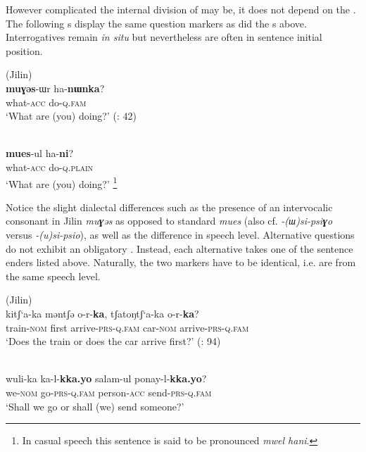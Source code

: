 However complicated the internal division of  may be, it does not depend on the . The following s display the same question markers as did the s above. Interrogatives remain \textit{in situ} \citep[265]{Sohn1999} but nevertheless are often in sentence initial position.

\ea%
    \label{ex:kore:4}
     (Jilin)\\
    \gll \textbf{{muɣəs}}-ɯr  ha-\textbf{{nɯnka}}?\\
    what-\textsc{acc}  do-\textsc{q.fam}\\
    \glt ‘What are (you) doing?’ (\citealt{XuanDewu1985}: 42)
    \z

\ea%
    \label{ex:kore:5}
    \\
    \gll \textbf{{mues}}-ul  ha-\textbf{{ni}}?\\
    what-\textsc{acc}  do-\textsc{q.plain}\\
    \glt ‘What are (you) doing?’ \citep[146]{Song2005}\footnote{In casual speech this sentence is said to be pronounced \textit{mwel hani}.}
    \z

\noindent Notice the slight dialectal differences such as the presence of an intervocalic consonant in Jilin  \textit{mu}\textbf{\textit{ɣ}}\textit{əs} as opposed to standard  \textit{mues} (also cf. \textit{-(ɯ)si-psi}\textbf{\textit{ɣ}}\textit{o} versus \textit{-(u)si-psio}), as well as the difference in speech level. Alternative questions do not exhibit an obligatory . Instead, each alternative takes one of the  sentence enders listed above. Naturally, the two markers have to be identical, i.e. are from the same speech level.

\ea%
    \label{ex:kore:6}
     (Jilin)\\
    \gll kitʃ‘a-ka  məntʃə  o-r-\textbf{{ka}},      tʃatoŋtʃ‘a-ka  o-r-\textbf{{ka}}?\\
    train-\textsc{nom}  first  arrive-\textsc{prs}-\textsc{q.fam}  car-\textsc{nom}  arrive-\textsc{prs}-\textsc{q.fam}\\
    \glt ‘Does the train or does the car arrive first?’ (\citealt{XuanDewu1985}: 94)
    \z

\ea%
    \label{ex:kore:7}
    \\
    \gll wuli-ka    ka-l-\textbf{{kka.yo}} salam-ul  ponay-l-\textbf{{kka.yo}}?\\
    we-\textsc{nom}  go-\textsc{prs}-\textsc{q.fam}    person-\textsc{acc}  send-\textsc{prs}-\textsc{q.fam}\\
    \glt ‘Shall we go or shall (we) send someone?’ \citep[122]{Sohn1994}
    \z

